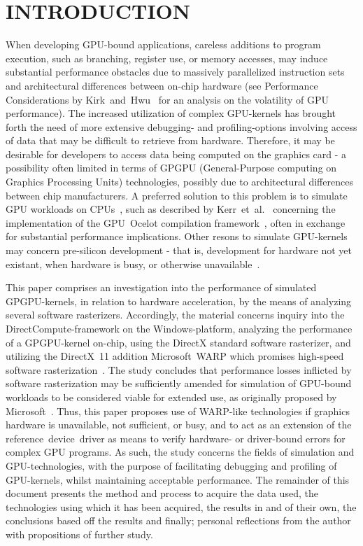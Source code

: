 
\section{INTRODUCTION}
\label{sec:introduction}
When developing GPU-bound applications, careless additions to  program execution, such as branching, register use, or memory accesses, may induce substantial performance obstacles due to massively parallelized instruction sets and architectural differences between on-chip hardware (see Performance Considerations by Kirk~and~Hwu~\cite[ch.~6]{Kirk:2010:PMP:1841511} for an analysis on the volatility of GPU performance).
The increased utilization of complex GPU-kernels has brought forth the need of more extensive debugging- and profiling-options involving access of data that may be difficult to retrieve from hardware.
Therefore, it may be desirable for developers to access data being computed on the graphics card - a possibility often limited in terms of GPGPU (General-Purpose computing on Graphics Processing Units) technologies, possibly due to architectural differences between chip manufacturers.
A preferred solution to this problem is to simulate GPU workloads on CPUs~, such as described by Kerr~et~al.~\cite[p.~416-419]{Hwu:2011:GCG:2103614} concerning the implementation of the GPU~Ocelot compilation framework~, often in exchange for substantial performance implications.
Other resons to simulate GPU-kernels may concern pre-silicon development - that is, development for hardware not yet existant, when hardware is busy, or otherwise unavailable~.

This paper comprises an investigation into the performance of simulated GPGPU-kernels, in relation to hardware acceleration, by the means of analyzing several software rasterizers.
Accordingly, the material concerns inquiry into the DirectCompute-framework on the Windows-platform, analyzing the performance of a GPGPU-kernel on-chip, using the DirectX standard software rasterizer, and utilizing the DirectX~11 addition Microsoft~WARP which promises high-speed software rasterization~.
The study concludes that performance losses inflicted by software rasterization may be sufficiently amended for simulation of GPU-bound workloads to be considered viable for extended use, as originally proposed by Microsoft~.
Thus, this paper proposes use of WARP-like technologies if graphics hardware is unavailable, not sufficient, or busy, and to act as an extension of the reference~device~driver as means to verify hardware- or driver-bound errors for complex GPU programs.
As such, the study concerns the fields of simulation and GPU-technologies, with the purpose of facilitating debugging and profiling of GPU-kernels, whilst maintaining acceptable performance.
The remainder of this document presents the method and process to acquire the data used, the technologies using which it has been acquired, the results in and of their own, the conclusions based off the results and finally; personal reflections from the author with propositions of further study.
